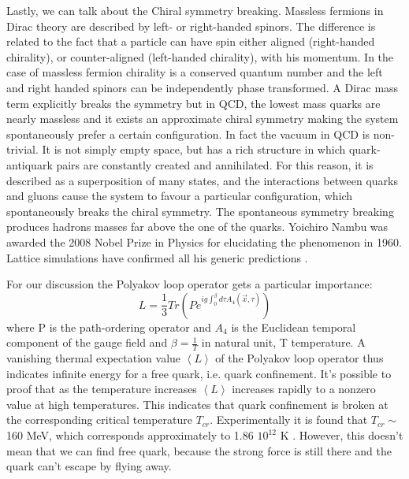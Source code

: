 \documentclass[12pt,a4paper]{book}
\begin{document}
	
	Lastly, we can talk about the Chiral symmetry breaking. Massless fermions in Dirac theory are described by left- or right-handed spinors. The difference is related to the fact that a particle can have spin either aligned (right-handed chirality), or counter-aligned (left-handed chirality), with his momentum. In the case of massless fermion chirality is a conserved quantum number and the left and right handed spinors can be independently phase transformed. A Dirac mass term explicitly breaks the symmetry but in QCD, the lowest mass quarks are nearly massless and it exists an approximate chiral symmetry making the system spontaneously prefer a certain configuration. In fact the vacuum in QCD is non-trivial. It is not simply empty space, but has a rich structure in which quark-antiquark pairs are constantly created and annihilated. For this reason, it is described as a superposition of many states, and the interactions between quarks and gluons cause the system to favour a particular configuration, which spontaneously breaks the chiral symmetry. The spontaneous symmetry breaking produces hadrons masses far above the one of the quarks. Yoichiro Nambu was awarded the 2008 Nobel Prize in Physics for elucidating the phenomenon in 1960. Lattice simulations have confirmed all his generic predictions \cite{Peskin:1995ev}.
	
	For our discussion the Polyakov loop operator gets a particular importance: 
	\begin{equation}
		L=\frac{1}{3} Tr \left(P e^{ig \int_{0}^{\beta} d\tau A_4(\vec{x},\tau) } \right)
		\label{eq:Polyakov-loop}
	\end{equation}
	where P is the path-ordering operator and $A_4$ is the Euclidean temporal component of the gauge field and $\beta= \frac{1}{T}$ in natural unit, T temperature. A vanishing thermal expectation value $\left<L\right>$ of the Polyakov loop operator thus indicates infinite energy for a free quark, i.e. quark confinement. It's possible to proof that as the temperature increases $\left<L\right>$ increases rapidly to a nonzero value at high temperatures. This indicates that quark confinement is broken at the corresponding critical temperature $T_{cr}$. Experimentally it is found that $T_{cr} \sim$ 160 MeV, which corresponds approximately to 1.86 $10^{12}$ K \cite{Herrmann:2920632}. However, this doesn't mean that we can find free quark, because the strong force is still there and the quark can't escape by flying away.
	
\end{document}
